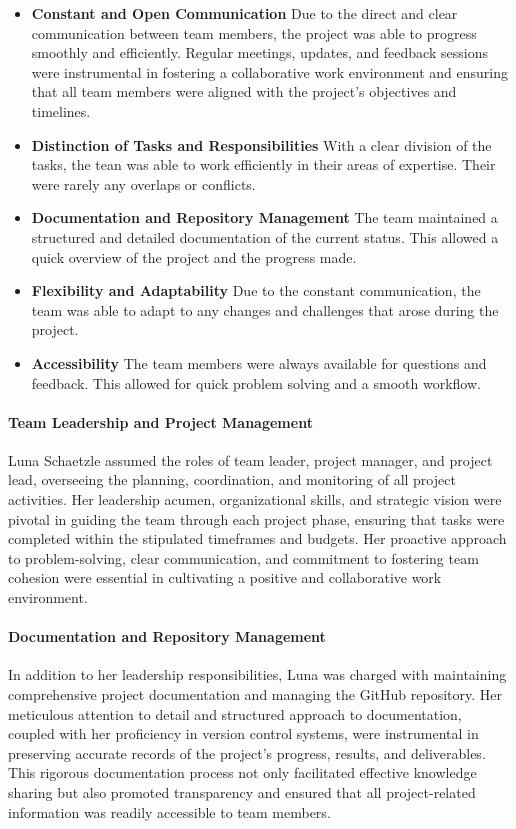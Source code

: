 \begin{itemize}
    \item \textbf{Constant and Open Communication} Due to the direct and clear communication between team members, the project was able to progress smoothly and efficiently. Regular meetings, updates, and feedback sessions were instrumental in fostering a collaborative work environment and ensuring that all team members were aligned with the project’s objectives and timelines.
    \item \textbf{Distinction of Tasks and Responsibilities} With a clear division of the tasks, the tean was able to work efficiently in their areas of expertise. Their were rarely any overlaps or conflicts.
    \item \textbf{Documentation and Repository Management} The team maintained a structured and detailed documentation of the current status. This allowed a quick overview of the project and the progress made.
    \item \textbf{Flexibility and Adaptability} Due to the constant communication, the team was able to adapt to any changes and challenges that arose during the project.
    \item \textbf{Accessibility} The team members were always available for questions and feedback. This allowed for quick problem solving and a smooth workflow.
\end{itemize}

\paragraph{Team Leadership and Project Management}  
Luna Schaetzle assumed the roles of team leader, project manager, and project lead, overseeing the planning, coordination, and monitoring of all project activities. Her leadership acumen, organizational skills, and strategic vision were pivotal in guiding the team through each project phase, ensuring that tasks were completed within the stipulated timeframes and budgets. Her proactive approach to problem-solving, clear communication, and commitment to fostering team cohesion were essential in cultivating a positive and collaborative work environment.

\paragraph{Documentation and Repository Management}  
In addition to her leadership responsibilities, Luna was charged with maintaining comprehensive project documentation and managing the GitHub repository. Her meticulous attention to detail and structured approach to documentation, coupled with her proficiency in version control systems, were instrumental in preserving accurate records of the project’s progress, results, and deliverables. This rigorous documentation process not only facilitated effective knowledge sharing but also promoted transparency and ensured that all project-related information was readily accessible to team members.

